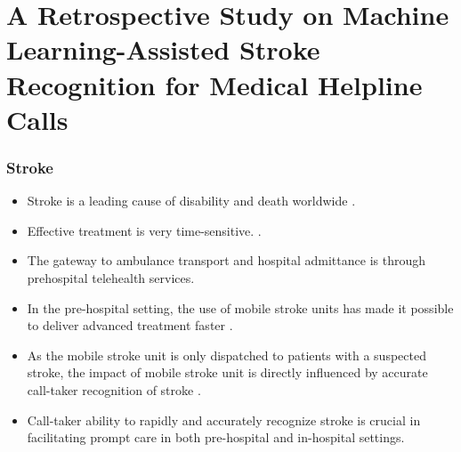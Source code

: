 
\section{A Retrospective Study on Machine Learning-Assisted Stroke Recognition for Medical Helpline Calls}


\begin{frame}
    \frametitle{Stroke}
    \begin{itemize}
        \item Stroke is a leading cause of disability and death worldwide \parencite{cite1,cite2,cite3}.
        \item Effective treatment is very time-sensitive. \parencite{cite4,cite5}.
        \item The gateway to ambulance transport and hospital admittance is through prehospital telehealth services.
        \item In the pre-hospital setting, the use of mobile stroke units has made it possible to deliver advanced treatment faster \parencite{cite6,cite7}.
        \item As the mobile stroke unit is only dispatched to patients with a suspected stroke, the impact of mobile stroke unit is directly influenced by accurate call-taker recognition of stroke \parencite{cite6,cite7}.
        \item Call-taker ability to rapidly and accurately recognize stroke is crucial in facilitating prompt care in both pre-hospital and in-hospital settings.
    \end{itemize}
\end{frame}


\begin{frame}
    \frametitle{}
\end{frame}


